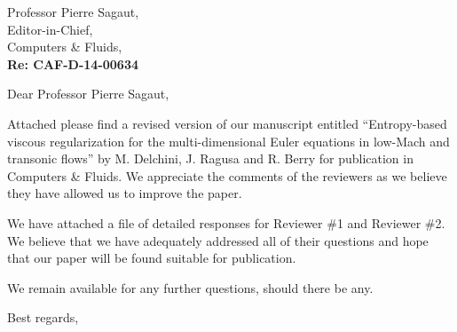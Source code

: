 
        \addtolength{\topmargin}{-2.5cm}    %
       \addtolength{\textheight}{5cm}    %

\address{Dr. Jean Ragusa \\
Nuclear Engineering Dept.\\
Texas A\&M University\\
College Station, TX
 \vspace{0.5cm}}


\signature{Marc Delchini, Jean Ragusa, and Ray Berry}




\begin{letter}{Professor Pierre Sagaut, \\  Editor-in-Chief,\\
    Computers \& Fluids,\\
\textbf{Re: CAF-D-14-00634}}


\date{\today}

\opening{Dear Professor Pierre Sagaut,}
         \vspace{0.25cm}

Attached please find a revised version of our manuscript entitled
``Entropy-based viscous regularization for the multi-dimensional Euler equations in low-Mach and transonic flows''
by M. Delchini, J. Ragusa and R. Berry for
publication in Computers \& Fluids. We appreciate the comments of the reviewers as we
believe they have allowed us to improve the paper.

We have attached a file of detailed responses for Reviewer \#1 and Reviewer \#2.
We believe that we have adequately addressed all of their questions and hope that our paper will be found suitable for publication.

%
%
\bigskip

We remain available for any further questions, should there be any.
\vspace{0.25cm}



\closing{Best regards, }

\end{letter}



